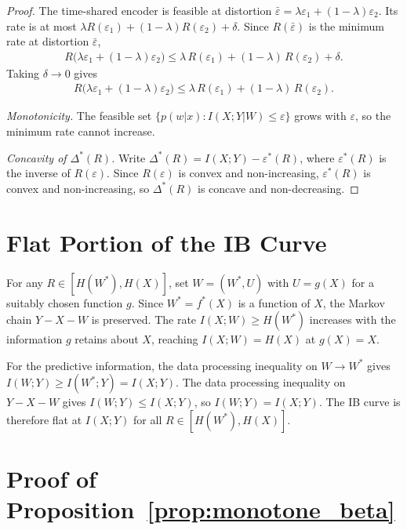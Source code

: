 \documentclass[11pt]{article}
\begin{document}
\begin{proof}
The time-shared encoder is feasible at distortion
$\bar{\varepsilon}=\lambda\varepsilon_1+(1-\lambda)\varepsilon_2$.
Its rate is at most $\lambda R(\varepsilon_1)+(1-\lambda)R(\varepsilon_2)+\delta$.
Since $R(\bar{\varepsilon})$ is the minimum rate at distortion
$\bar{\varepsilon}$,
\begin{align}
    R\bigl(\lambda\varepsilon_1+(1-\lambda)\varepsilon_2\bigr)
    \leq \lambda\,R(\varepsilon_1)+(1-\lambda)\,R(\varepsilon_2)
    +\delta.
\end{align}
Taking $\delta\to 0$ gives
\begin{align}
    R\bigl(\lambda\varepsilon_1+(1-\lambda)\varepsilon_2\bigr)
    \leq \lambda\,R(\varepsilon_1)+(1-\lambda)\,R(\varepsilon_2).
\end{align}

\textit{Monotonicity.}
The feasible set $\{p(w|x):I(X;Y|W)\leq\varepsilon\}$ grows with
$\varepsilon$, so the minimum rate cannot increase.

\textit{Concavity of $\Delta^*(R)$.}
Write $\Delta^*(R)=I(X;Y)-\varepsilon^*(R)$, where $\varepsilon^*(R)$
is the inverse of $R(\varepsilon)$.
Since $R(\varepsilon)$ is convex and non-increasing, $\varepsilon^*(R)$
is convex and non-increasing, so $\Delta^*(R)$ is concave and
non-decreasing.
\end{proof}

\section{Flat Portion of the IB Curve}
\label{app:flat_portion}

For any $R\in[H(W^*),H(X)]$, set $W=(W^*,U)$ with $U=g(X)$ for a
suitably chosen function $g$.
Since $W^*=f^*(X)$ is a function of $X$, the Markov chain $Y-X-W$ is
preserved.
The rate $I(X;W)\geq H(W^*)$ increases with the information $g$
retains about $X$, reaching $I(X;W)=H(X)$ at $g(X)=X$.

For the predictive information, the data processing inequality on
$W\to W^*$ gives $I(W;Y)\geq I(W^*;Y)=I(X;Y)$. The data processing
inequality on $Y-X-W$ gives $I(W;Y)\leq I(X;Y)$, so
$I(W;Y)=I(X;Y)$.
The IB curve is therefore flat at $I(X;Y)$ for all $R\in[H(W^*),H(X)]$.

\section{Proof of Proposition~\ref{prop:monotone_beta}}
\label{app:monotone_beta}
\end{document}
